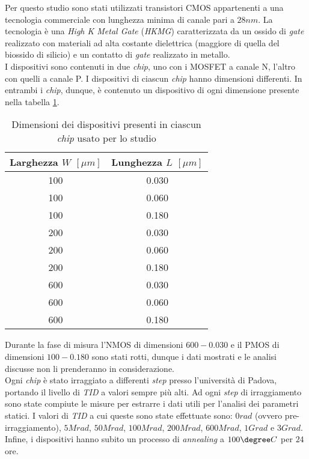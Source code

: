 Per questo studio sono stati utilizzati transistori CMOS appartenenti a una tecnologia commerciale con lunghezza minima di canale pari a $28nm$. La tecnologia è una \textit{High K Metal Gate} (\textit{HKMG}) caratterizzata da un ossido di \emph{gate} realizzato con materiali ad alta costante dielettrica (maggiore di quella del biossido di silicio) e un contatto di \emph{gate} realizzato in metallo.\\

I dispositivi sono contenuti in due \emph{chip}, uno con i MOSFET a canale N, l'altro con quelli a canale P. I dispositivi di ciascun \emph{chip} hanno dimensioni differenti. In entrambi i \emph{chip}, dunque, è contenuto un dispositivo di ogni dimensione presente nella tabella \ref{tab:dimensioniMOSFET}.

\begin{table}[ht]
  \renewcommand{\arraystretch}{1.3}
  \centering
    \begin{tabular}{c c }
      \toprule
          Larghezza $W$ $[\mu m]$ & Lunghezza $L$ $[\mu m]$ \\
     \midrule
	   100 & 0.030 \\
	\hline
	   100 & 0.060 \\
	\hline
	   100 & 0.180 \\
	\hline
	   200 & 0.030 \\
 	\hline
	   200 & 0.060 \\
	\hline
	   200 & 0.180 \\
	\hline
 	   600 & 0.030 \\
	\hline
	   600 & 0.060 \\
	\hline
	   600 & 0.180 \\
      \bottomrule
    \end{tabular}
 
  \caption{Dimensioni dei dispositivi presenti in ciascun \emph{chip} usato per lo studio}
  \label{tab:dimensioniMOSFET}
\end{table}

Durante la fase di misura l'NMOS di dimensioni $600-0.030$ e il PMOS di dimensioni $100-0.180$ sono stati rotti, dunque i dati mostrati e le analisi discusse non li prenderanno in considerazione.\\

Ogni \emph{chip} è stato irraggiato a differenti \emph{step} presso l'università di Padova, portando il livello di \emph{TID} a valori sempre più alti. Ad ogni \emph{step} di irraggiamento sono state compiute le misure per estrarre i dati utili per l'analisi dei parametri statici. I valori di \emph{TID} a cui queste sono state effettuate sono: $0 rad$ (ovvero pre-irraggiamento), $5 Mrad$, $50 Mrad$, $100 Mrad$, $200 Mrad$, $600 Mrad$, $1 Grad$ e $3 Grad$. Infine, i dispositivi hanno subito un processo di \emph{annealing} a $100\degree C$ per $24$ ore.

